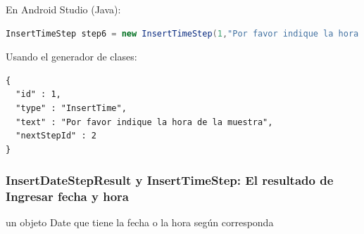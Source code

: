 En Android Studio (Java):
\begin{lstlisting}[language=Java, frame=tlb]	
InsertTimeStep step6 = new InsertTimeStep(1,"Por favor indique la hora de la muestra",2); 
\end{lstlisting}

Usando el generador de clases:
\begin{lstlisting}[language=XML, frame=tlb]	
{
  "id" : 1,
  "type" : "InsertTime",
  "text" : "Por favor indique la hora de la muestra",
  "nextStepId" : 2
}
\end{lstlisting}

\subsubsection{InsertDateStepResult y InsertTimeStep: El resultado de Ingresar fecha y hora}
un objeto Date que tiene la fecha o la hora según corresponda

